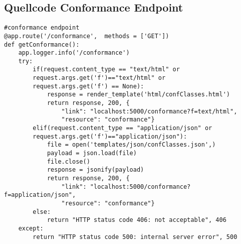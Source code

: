 \newpage
\subsection{Quellcode Conformance Endpoint}
\begin{lstlisting}[caption={Conformance Endpoint}, style = Python]
#conformance endpoint
@app.route('/conformance',  methods = ['GET'])
def getConformance():
    app.logger.info('/conformance') 
    try:
        if(request.content_type == "text/html" or 
        request.args.get('f')=="text/html" or 
        request.args.get('f') == None): 
            response = render_template('html/confClasses.html') 
            return response, 200, {
                "link": "localhost:5000/conformance?f=text/html", 
                "resource": "conformance"}
        elif(request.content_type == "application/json" or 
        request.args.get('f')=="application/json"): 
            file = open('templates/json/confClasses.json',)
            payload = json.load(file) 
            file.close() 
            response = jsonify(payload) 
            return response, 200, {
                "link": "localhost:5000/conformance?f=application/json",
                "resource": "conformance"} 
        else:
            return "HTTP status code 406: not acceptable", 406 
    except:
        return "HTTP status code 500: internal server error", 500
\end{lstlisting}\label{QuellcodeConformance}   

\newpage
